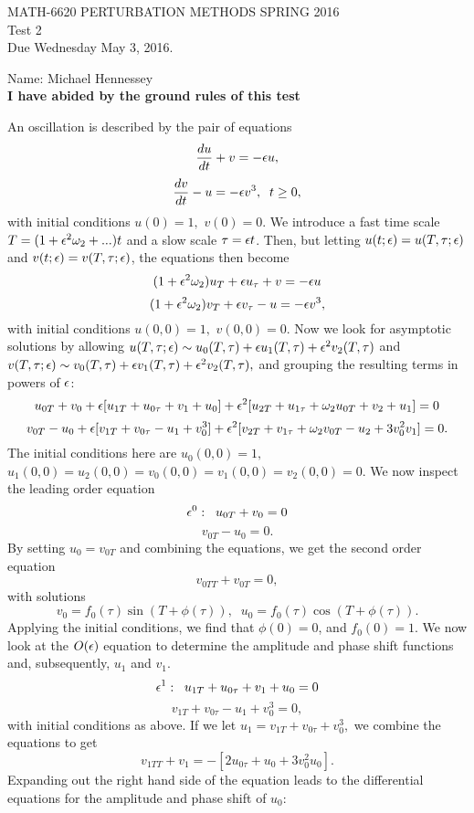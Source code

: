 
\pagestyle{empty}


\begin{center}
\large{ MATH-6620 \hspace{1in}  PERTURBATION METHODS \hspace{1in}SPRING 2016\\ Test 2 \\ Due Wednesday May 3, 2016.}\end{center}

Name: Michael Hennessey\\
\textbf{I have abided by the ground rules of this test}

\bigskip
{} \ec

\benum

\item An oscillation is described by the pair of equations
$$\frac{du}{dt}+v=-\epsilon u,$$
$$\frac{dv}{dt}-u=-\epsilon v^3,\;\;t\geq 0,$$
with initial conditions $u(0)=1,$ $v(0)=0.$ We introduce a fast time scale $T=(1+\epsilon^2\omega_2+...)t$ and a slow scale $\tau=\epsilon t$. Then, but letting $u(t;\epsilon)=u(T,\tau;\epsilon)$ and $v(t;\epsilon)=v(T,\tau;\epsilon)$, the equations then become
$$(1+\epsilon^2\omega_2)u_T+\epsilon u_\tau+v=-\epsilon u$$
$$(1+\epsilon^2\omega_2)v_T+\epsilon v_\tau-u=-\epsilon v^3,$$
with initial conditions $u(0,0)=1,$ $v(0,0)=0.$ Now we look for asymptotic solutions by allowing
$u(T,\tau;\epsilon)\sim u_0(T,\tau)+\epsilon u_1(T,\tau)+\epsilon^2 v_2(T,\tau)$ and $v(T,\tau;\epsilon)\sim v_0(T,\tau)+\epsilon v_1(T,\tau)+\epsilon^2 v_2(T,\tau),$ and grouping the resulting terms in powers of $\epsilon$:
$$u_{0T}+v_0+\epsilon[u_{1T}+u_{0\tau}+v_1+u_0]+\epsilon^2[u_{2T}+u_{1\tau}+\omega_2u_{0T}+v_2+u_1]=0$$
$$v_{0T}-u_0+\epsilon[v_{1T}+v_{0\tau}-u_1+v_0^3]+\epsilon^2[v_{2T}+v_{1\tau}+\omega_2v_{0T}-u_2+3v_0^2v_1]=0.$$
The initial conditions here are $u_0(0,0)=1,$ $u_1(0,0)=u_2(0,0)=v_0(0,0)=v_1(0,0)=v_2(0,0)=0.$ We now inspect the leading order equation
$$\epsilon^0:\;\; u_{0T}+v_0=0$$
$$v_{0T}-u_0=0.$$
By setting $u_0=v_{0T}$ and combining the equations, we get the second order equation
$$v_{0TT}+v_{0T}=0,$$
with solutions
$$v_0=f_0(\tau)\sin(T+\phi(\tau)),\;\;u_0=f_0(\tau)\cos(T+\phi(\tau)).$$
Applying the initial conditions, we find that $\phi(0)=0$, and $f_0(0)=1.$ We now look at the $O(\epsilon)$ equation to determine the amplitude and phase shift functions and, subsequently, $u_1$ and $v_1.$
$$\epsilon^1:\;\; u_{1T}+u_{0\tau}+v_1+u_0=0$$
$$v_{1T}+v_{0\tau}-u_1+v_0^3=0,$$
with initial conditions as above.
If we let $u_1=v_{1T}+v_{0\tau}+v_0^3,$ we combine the equations to get
$$v_{1TT}+v_1=-[2u_{0\tau}+u_0+3v_0^2u_0].$$
Expanding out the right hand side of the equation leads to the differential equations for the amplitude and phase shift of $u_0$:
